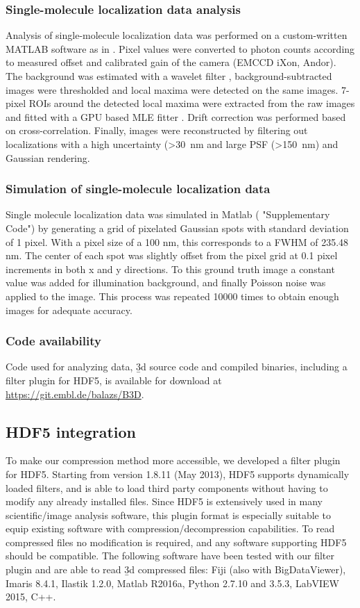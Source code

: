 \subsubsection{Single-molecule localization data analysis}
Analysis of single-molecule localization data was performed on a custom-written MATLAB software as in \cite{deschamps_efficient_2016}. Pixel values were converted to photon counts according to measured offset and calibrated gain of the camera (EMCCD iXon, Andor). The background was estimated with a wavelet filter \cite{izeddin_wavelet_2012}, background-subtracted images were thresholded and local maxima were detected on the same images. 7-pixel ROIs around the detected local maxima were extracted from the raw images and fitted with a GPU based MLE fitter \cite{smith_fast_2010}. Drift correction was performed based on cross-correlation. Finally, images were
reconstructed by filtering out localizations with a high uncertainty (>\SI{30}{nm} and large PSF (>\SI{150}{nm}) and Gaussian rendering.

\subsubsection{Simulation of single-molecule localization data}
Single molecule localization data was simulated in Matlab ( "Supplementary Code") by generating a grid of pixelated Gaussian spots with standard deviation of 1 pixel. With a pixel size of a 100 nm, this corresponds to a FWHM of 235.48 nm. The center of each spot was slightly offset from the pixel grid at 0.1 pixel increments in both x and y directions. To this ground truth image a constant value was added for illumination background, and finally Poisson noise was applied to the image. This process was repeated 10000 times to obtain enough images for adequate accuracy.

\subsubsection{Code availability}
Code used for analyzing data, \b3d source code and compiled binaries, including a filter plugin for HDF5, is available for download at \url{https://git.embl.de/balazs/B3D}.

\subsection{HDF5 integration}
To make our compression method more accessible, we developed a filter plugin for HDF5. Starting from version 1.8.11 (May 2013), HDF5 supports dynamically loaded filters, and is able to load third party components without having to modify any already installed files. Since HDF5 is extensively used in many scientific/image analysis software, this plugin format is especially suitable to equip existing software with compression/decompression capabilities. To read compressed files no modification is required, and any software supporting HDF5 should be compatible. The following software have been tested with our filter plugin and are able to read \b3d compressed files:
Fiji (also with BigDataViewer), Imaris 8.4.1, Ilastik 1.2.0, Matlab R2016a, Python 2.7.10 and 3.5.3, LabVIEW 2015, C++.

